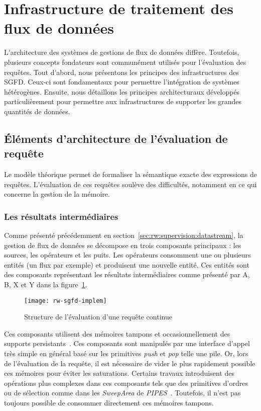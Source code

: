\section{Infrastructure de traitement des flux de données}\label{sec:rw:sgfd:infra}
L'architecture des systèmes de gestions de flux de données diffère. Toutefois, plusieurs concepts fondateurs sont communément utilisés pour l'évaluation des requêtes. Tout d'abord, nous présentons les principes des infrastructures des SGFD. Ceux-ci sont fondamentaux pour permettre l'intégration de systèmes hétérogènes. Ensuite, nous détaillons les principes architecturaux développés particulièrement pour permettre aux infrastructures de supporter les grandes quantités de données.

\subsection{Éléments d'architecture de l'évaluation de requête}
Le modèle théorique permet de formaliser la sémantique exacte des expressions de requêtes. L'évaluation de ces requêtes soulève des difficultés, notamment en ce qui concerne la gestion de la mémoire.

\subsubsection{Les résultats intermédiaires}
Comme présenté précédemment en section~\ref{sec:rw:supervision:datastream}, la gestion de flux de données se décompose en trois composants principaux : les sources, les opérateurs et les puits. Les opérateurs consomment une ou plusieurs entités (un flux par exemple) et produisent une nouvelle entité. Ces entités sont des composants représentant les résultats intermédiaires comme présenté par A, B, X et Y dans la figure~\ref{fig:rw:sgfd:implem}.
\begin{figure}[ht]
    \centering
    \texttt{[image: rw-sgfd-implem]}
    \caption{Structure de l'évaluation d'une requête continue}\label{fig:rw:sgfd:implem}
\end{figure}

Ces composants utilisent des mémoires tampons et occasionnellement des supports persistants~\cite{Abadi:aurora}. Ces composants sont manipulés par une interface d'appel très simple en général basé sur les primitives \textit{push} et \textit{pop} telle une pile. Or, lors de l'évaluation de la requête, il est nécessaire de vider le plus rapidement possible ces mémoires pour éviter les saturations. Certains travaux introduisent des opérations plus complexes dans ces composants tels que des primitives d'ordres ou de sélection comme dans les \textit{SweepArea} de \textit{PIPES}~\cite{Kramer:semantics}. Toutefois, il n'est pas toujours possible de consommer directement ces mémoires tampons.

